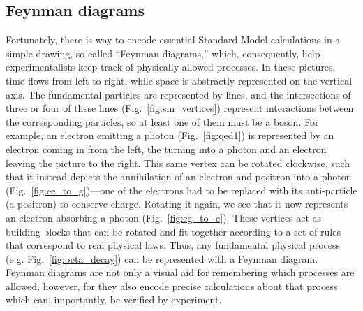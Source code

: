 \subsection{Feynman diagrams}
Fortunately, there is way to encode essential Standard Model calculations in a simple drawing, so-called ``Feynman diagrams,'' which, consequently, help experimentalists keep track of physically allowed processes. 
In these pictures, time flows from left to right, while space is abstractly represented on the vertical axis\footnotemark{}. 
The fundamental particles are represented by lines, and the intersections of three or four of these lines (Fig.~\ref{fig:sm_vertices}) represent interactions between the corresponding particles, so at least one of them must be a boson. 
For example, an electron emitting a photon (Fig.~\ref{fig:qed1}) is represented by an electron coming in from the left, the turning into a photon and an electron leaving the picture to the right. 
This same vertex can be rotated clockwise, such that it instead depicts the annihilation of an electron and positron into a photon (Fig.~\ref{fig:ee_to_g})---one of the electrons had to be replaced with its anti-particle (a positron) to conserve charge. 
Rotating it again, we see that it now represents an electron absorbing a photon (Fig.~\ref{fig:eg_to_e}). 
These vertices act as building blocks that can be rotated and fit together according to a set of rules that correspond to real physical laws. 
Thus, any fundamental physical process (e.g. Fig.~\ref{fig:beta_decay}) can be represented with a Feynman diagram. 
Feynman diagrams are not only a visual aid for remembering which processes are allowed, however, for they also encode precise calculations about that process which can, importantly, be verified by experiment.

